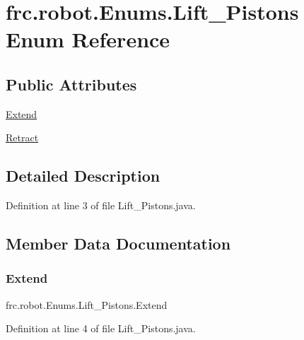 \hypertarget{enumfrc_1_1robot_1_1_enums_1_1_lift___pistons}{}\section{frc.\+robot.\+Enums.\+Lift\+\_\+\+Pistons Enum Reference}
\label{enumfrc_1_1robot_1_1_enums_1_1_lift___pistons}
\subsection*{Public Attributes}
\begin{DoxyCompactItemize}
\item 
\hyperlink{enumfrc_1_1robot_1_1_enums_1_1_lift___pistons_a6330e41bb1e82289bb679d21e466cb04}{Extend}
\item 
\hyperlink{enumfrc_1_1robot_1_1_enums_1_1_lift___pistons_a95ac3a721cf39027b6e0bd0ea87f2a13}{Retract}
\end{DoxyCompactItemize}


\subsection{Detailed Description}


Definition at line 3 of file Lift\+\_\+\+Pistons.\+java.



\subsection{Member Data Documentation}
\mbox{\label{enumfrc_1_1robot_1_1_enums_1_1_lift___pistons_a6330e41bb1e82289bb679d21e466cb04}} 
\subsubsection{\texorpdfstring{Extend}{Extend}}
{\footnotesize\ttfamily frc.\+robot.\+Enums.\+Lift\+\_\+\+Pistons.\+Extend}



Definition at line 4 of file Lift\+\_\+\+Pistons.\+java.

\mbox{\label{enumfrc_1_1robot_1_1_enums_1_1_lift___pistons_a95ac3a721cf39027b6e0bd0ea87f2a13}} 

